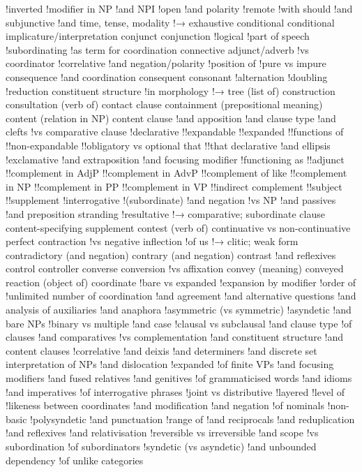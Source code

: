 !inverted
!modifier in NP
!and NPI
!open
!and polarity
!remote
!with should
!and subjunctive
!and time, tense, modality
!→ exhaustive conditional
conditional implicature/interpretation
conjunct
conjunction
!logical
!part of speech
!subordinating
!as term for coordination
connective adjunct/adverb
!vs coordinator
!correlative
!and negation/polarity
!position of
!pure vs impure
consequence
!and coordination
consequent
consonant
!alternation
!doubling
!reduction
constituent structure
!in morphology
!→ tree (list of)
construction
consultation (verb of)
contact clause
containment (prepositional meaning)
content (relation in NP)
content clause
!and apposition
!and clause type
!and clefts
!vs comparative clause
!declarative
!!expandable
!!expanded
!!functions of
!!non-expandable
!!obligatory vs optional that
!!that declarative
!and ellipsis
!exclamative
!and extraposition
!and focusing modifier
!functioning as
!!adjunct
!!complement in AdjP
!!complement in AdvP
!!complement of like
!!complement in NP
!!complement in PP
!!complement in VP
!!indirect complement
!!subject
!!supplement
!interrogative
!(subordinate)
!and negation
!vs NP
!and passives
!and preposition stranding
!resultative
!→ comparative; subordinate clause
content-specifying supplement
contest (verb of)
continuative vs non-continuative perfect
contraction
!vs negative inflection
!of us
!→ clitic; weak form
contradictory (and negation)
contrary (and negation)
contrast
!and reflexives
control
controller
converse
conversion
!vs affixation
convey (meaning)
conveyed reaction (object of)
coordinate
!bare vs expanded
!expansion by modifier
!order of
!unlimited number of
coordination
!and agreement
!and alternative questions
!and analysis of auxiliaries
!and anaphora
!asymmetric (vs symmetric)
!asyndetic
!and bare NPs
!binary vs multiple
!and case
!clausal vs subclausal
!and clause type
!of clauses
!and comparatives
!vs complementation
!and constituent structure
!and content clauses
!correlative
!and deixis
!and determiners
!and discrete set interpretation of NPs
!and dislocation
!expanded
!of finite VPs
!and focusing modifiers
!and fused relatives
!and genitives
!of grammaticised words
!and idioms
!and imperatives
!of interrogative phrases
!joint vs distributive
!layered
!level of
!likeness between coordinates
!and modification
!and negation
!of nominals
!non-basic
!polysyndetic
!and punctuation
!range of
!and reciprocals
!and reduplication
!and reflexives
!and relativisation
!reversible vs irreversible
!and scope
!vs subordination
!of subordinators
!syndetic (vs asyndetic)
!and unbounded dependency
!of unlike categories
